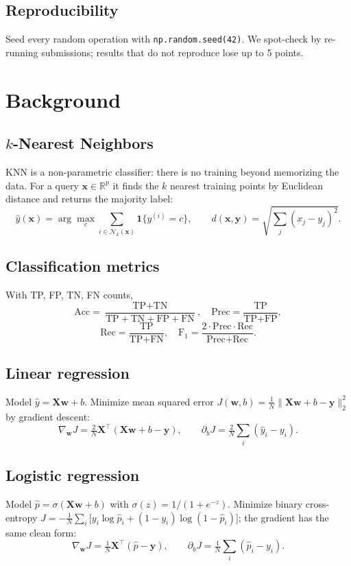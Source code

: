 \documentclass[11pt,a4paper]{article}
\newcommand{\R}{\mathbb{R}}
\newcommand{\xx}{\mathbf{x}}
\newcommand{\ww}{\mathbf{w}}
\newcommand{\yy}{\mathbf{y}}
\newcommand{\XX}{\mathbf{X}}
\begin{document}
\subsection{Reproducibility}
Seed every random operation with \texttt{np.random.seed(42)}. We spot-check by re-running submissions; results that do not reproduce lose up to 5 points.

\section{Background}

\subsection{$k$-Nearest Neighbors}
KNN is a non-parametric classifier: there is no training beyond memorizing the data. For a query $\xx\in\R^p$ it finds the $k$ nearest training points by Euclidean distance and returns the majority label:
\[
  \hat{y}(\xx)=\arg\max_{c}\sum_{i\in\mathcal{N}_k(\xx)}\mathbf{1}\{y^{(i)}=c\},
  \qquad
  d(\xx,\yy)=\sqrt{\textstyle\sum_{j}(x_j-y_j)^2}.
\]

\subsection{Classification metrics}
With TP, FP, TN, FN counts,
\[
  \text{Acc}=\frac{\text{TP}+\text{TN}}{\text{TP}+\text{TN}+\text{FP}+\text{FN}},\quad
  \text{Prec}=\frac{\text{TP}}{\text{TP}+\text{FP}},
\]
\[
  \text{Rec}=\frac{\text{TP}}{\text{TP}+\text{FN}},\quad
  \text{F}_1=\frac{2\cdot\text{Prec}\cdot\text{Rec}}{\text{Prec}+\text{Rec}}.
\]

\subsection{Linear regression}
Model $\hat{y}=\XX\ww+b$. Minimize mean squared error
$J(\ww,b)=\frac{1}{N}\lVert \XX\ww+b-\yy\rVert_2^2$ by gradient descent:
\[
  \nabla_{\ww}J=\tfrac{2}{N}\XX^\top(\XX\ww+b-\yy),\qquad
  \partial_b J=\tfrac{2}{N}\textstyle\sum_i(\hat{y}_i-y_i).
\]

\subsection{Logistic regression}
Model $\hat{p}=\sigma(\XX\ww+b)$ with $\sigma(z)=1/(1+e^{-z})$. Minimize binary cross-entropy
$J=-\frac{1}{N}\sum_i\big[y_i\log\hat{p}_i+(1-y_i)\log(1-\hat{p}_i)\big]$; the gradient has the same clean form:
\[
  \nabla_{\ww}J=\tfrac{1}{N}\XX^\top(\hat{p}-\yy),\qquad
  \partial_b J=\tfrac{1}{N}\textstyle\sum_i(\hat{p}_i-y_i).
\]
\end{document}
